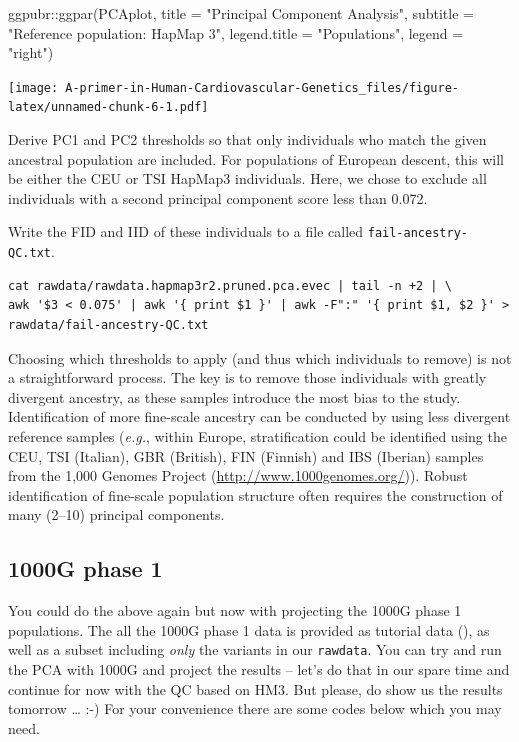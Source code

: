 \documentclass[
]{book}
\newenvironment{Shaded}{\begin{snugshade}}{\end{snugshade}}
\newcommand{\AttributeTok}[1]{\textcolor[rgb]{0.77,0.63,0.00}{#1}}
\newcommand{\FunctionTok}[1]{\textcolor[rgb]{0.00,0.00,0.00}{#1}}
\newcommand{\NormalTok}[1]{#1}
\newcommand{\SpecialCharTok}[1]{\textcolor[rgb]{0.00,0.00,0.00}{#1}}
\newcommand{\StringTok}[1]{\textcolor[rgb]{0.31,0.60,0.02}{#1}}
\begin{document}
\begin{Shaded}
\begin{Highlighting}[]
\NormalTok{  ggpubr}\SpecialCharTok{::}\FunctionTok{ggpar}\NormalTok{(PCAplot,}
                \AttributeTok{title =} \StringTok{"Principal Component Analysis"}\NormalTok{,}
                \AttributeTok{subtitle =} \StringTok{"Reference population: HapMap 3"}\NormalTok{,}
                \AttributeTok{legend.title =} \StringTok{"Populations"}\NormalTok{, }\AttributeTok{legend =} \StringTok{"right"}\NormalTok{)}
\end{Highlighting}
\end{Shaded}

\texttt{[image: A-primer-in-Human-Cardiovascular-Genetics\_files/figure-latex/unnamed-chunk-6-1.pdf]}

Derive PC1 and PC2 thresholds so that only individuals who match the given ancestral population are included. For populations of European descent, this will be either the CEU or TSI HapMap3 individuals. Here, we chose to exclude all individuals with a second principal component score less than 0.072.

Write the FID and IID of these individuals to a file called \texttt{fail-ancestry-QC.txt}.

\begin{verbatim}
cat rawdata/rawdata.hapmap3r2.pruned.pca.evec | tail -n +2 | \
awk '$3 < 0.075' | awk '{ print $1 }' | awk -F":" '{ print $1, $2 }' > rawdata/fail-ancestry-QC.txt
\end{verbatim}

Choosing which thresholds to apply (and thus which individuals to remove) is not a straightforward process. The key is to remove those individuals with greatly divergent ancestry, as these samples introduce the most bias to the study. Identification of more fine-scale ancestry can be conducted by using less divergent reference samples (\emph{e.g.}, within Europe, stratification could be identified using the CEU, TSI (Italian), GBR (British), FIN (Finnish) and IBS (Iberian) samples from the 1,000 Genomes Project (\url{http://www.1000genomes.org/})). Robust identification of fine-scale population structure often requires the construction of many (2--10) principal components.

\hypertarget{g-phase-1}{%
\subsection{1000G phase 1}\label{g-phase-1}}

You could do the above again but now with projecting the 1000G phase 1 populations. The all the 1000G phase 1 data is provided as tutorial data (), as well as a subset including \emph{only} the variants in our \texttt{rawdata}. You can try and run the PCA with 1000G and project the results -- let's do that in our spare time and continue for now with the QC based on HM3. But please, do show us the results tomorrow \ldots{} :-) For your convenience there are some codes below which you may need.
\end{document}
